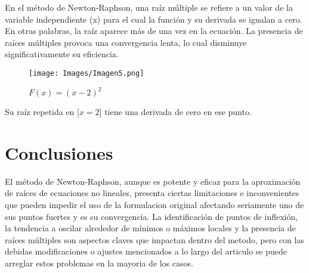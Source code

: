 \documentclass[conference]{IEEEtran}
\begin{document}
En el método de Newton-Raphson, una raíz múltiple se refiere a un valor de la variable independiente (x) para el cual la función y su derivada se igualan a cero. En otras palabras, la raíz aparece más de una vez en la ecuación. 
La presencia de raíces múltiples provoca una convergencia lenta, lo cual disminuye significativamente su eficiencia.

 \begin{figure} [h]
            \centering
            \texttt{[image: Images/Imagen5.png]}
            \caption{$F(x)=(x-2)^2$}
            \label{fig:fig5}
       \end{figure}

Su raíz repetida en [$x=2$] tiene una derivada de cero en ese punto. 


\section{Conclusiones}

El método de Newton-Raphson, aunque es potente y eficaz para 
la aproximación de raíces de ecuaciones no lineales, presenta ciertas 
limitaciones e inconvenientes que pueden impedir el uso de la formulacion original afectando seriamente uno de sus puntos fuertes y es su convergencia. La 
identificación de puntos de inflexión, la tendencia a oscilar alrededor 
de mínimos o máximos locales y la presencia de raíces múltiples son aspectos claves que impactan dentro del metodo, pero con las debidas modificaciones o ajustes mencionados a lo largo del articulo se puede arreglar estos problemas en la mayoria de los casos. 

\nocite{eljach2018eficacia}
\nocite{urepublicana}
\nocite{mathcad14}
\nocite{}


\end{document}
